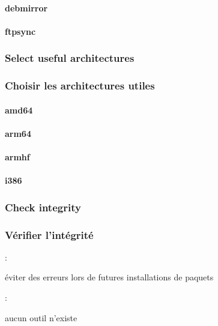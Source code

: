 \paragraph{debmirror}

\paragraph{ftpsync}

\ml
{\subsubsection{Select useful architectures}}
{\subsubsection{Choisir les architectures utiles}}

\paragraph{amd64}

\paragraph{arm64}

\paragraph{armhf}

\paragraph{i386}

\ml
{\subsubsection{Check integrity}}
{\subsubsection{Vérifier l’intégrité}}

:
\begin{itmz}
\item{
{éviter des erreurs lors de futures installations de paquets}}
\end{itmz}

:
\begin{itmz}
\item{
{aucun outil n’existe}}
\end{itmz}

